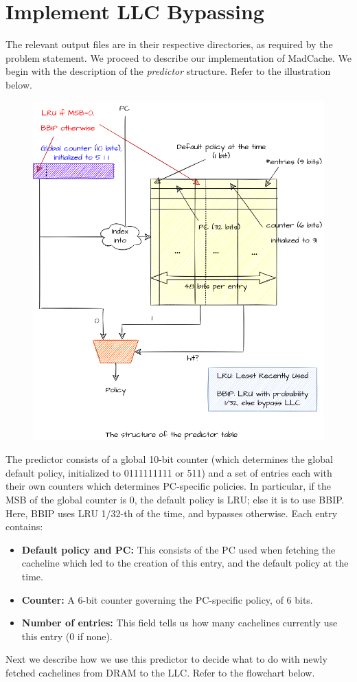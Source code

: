 \documentclass[11pt, swedish, openany]{book}
\begin{document}
\chapter{Implement LLC Bypassing}
The relevant output files are in their respective directories, as required by the problem statement. We proceed to describe our implementation of MadCache. We begin with the description of the \textit{predictor} structure. Refer to the illustration below.
\begin{figure}[H]
    \centering
    \includegraphics[width=0.6\linewidth]{images/predictor.png}
\end{figure}
The predictor consists of a global 10-bit counter (which determines the global default policy, initialized to 0111111111 or 511) and a set of entries each with their own counters which determines PC-specific policies. In particular, if the MSB of the global counter is 0, the default policy is LRU; else it is to use BBIP. Here, BBIP uses LRU 1/32-th of the time, and bypasses otherwise. Each entry contains:
\begin{itemize}
    \item \textbf{Default policy and PC:} This consists of the PC used when fetching the cacheline which led to the creation of this entry, and the default policy at the time. 
    \item \textbf{Counter:} A 6-bit counter governing the PC-specific policy, of 6 bits.
    \item \textbf{Number of entries:} This field tells us how many cachelines currently use this entry (0 if none).
\end{itemize}
Next we describe how we use this predictor to decide what to do with newly fetched cachelines from DRAM to the LLC. Refer to the flowchart below.
\end{document}
